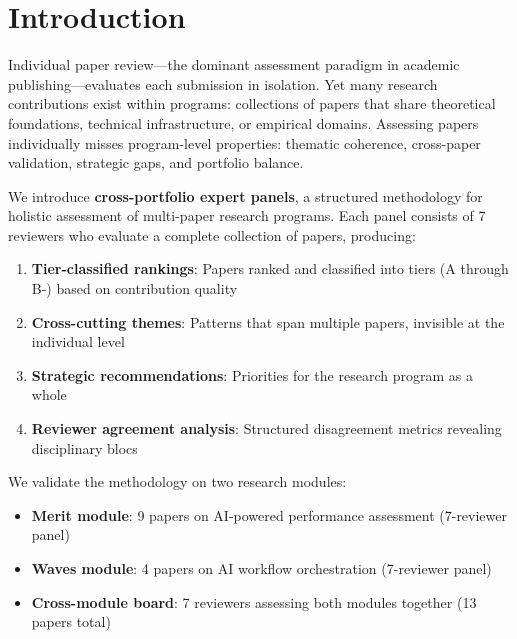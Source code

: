 \section{Introduction}

Individual paper review---the dominant assessment paradigm in academic publishing---evaluates each submission in isolation. Yet many research contributions exist within programs: collections of papers that share theoretical foundations, technical infrastructure, or empirical domains. Assessing papers individually misses program-level properties: thematic coherence, cross-paper validation, strategic gaps, and portfolio balance.

We introduce \textbf{cross-portfolio expert panels}, a structured methodology for holistic assessment of multi-paper research programs. Each panel consists of 7 reviewers who evaluate a complete collection of papers, producing:

\begin{enumerate}
    \item \textbf{Tier-classified rankings}: Papers ranked and classified into tiers (A through B-) based on contribution quality
    \item \textbf{Cross-cutting themes}: Patterns that span multiple papers, invisible at the individual level
    \item \textbf{Strategic recommendations}: Priorities for the research program as a whole
    \item \textbf{Reviewer agreement analysis}: Structured disagreement metrics revealing disciplinary blocs
\end{enumerate}

We validate the methodology on two research modules:
\begin{itemize}
    \item \textbf{Merit module}: 9 papers on AI-powered performance assessment (7-reviewer panel)
    \item \textbf{Waves module}: 4 papers on AI workflow orchestration (7-reviewer panel)
    \item \textbf{Cross-module board}: 7 reviewers assessing both modules together (13 papers total)
\end{itemize}
